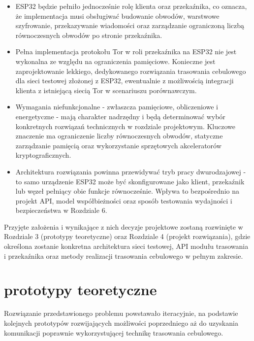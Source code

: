\documentclass[thesis=inz,faculty=ee]{EE-dyplom}
\begin{document}
    \begin{itemize}
    
    \item ESP32 będzie pełniło jednocześnie rolę klienta oraz przekaźnika, co oznacza, że implementacja musi obsługiwać budowanie obwodów, warstwowe szyfrowanie, 
    przekazywanie wiadomości oraz zarządzanie ograniczoną liczbą równoczesnych obwodów po stronie przekaźnika.

    \item Pełna implementacja protokołu Tor w roli przekaźnika na ESP32 nie jest wykonalna ze względu na ograniczenia pamięciowe. Konieczne jest zaprojektowanie 
    lekkiego, dedykowanego rozwiązania trasowania cebulowego dla sieci testowej złożonej z ESP32, ewentualnie z możliwością integracji klienta z istniejącą siecią Tor w 
    scenariuszu porównawczym.

    \item Wymagania niefunkcjonalne - zwłaszcza pamięciowe, obliczeniowe i energetyczne - mają charakter nadrzędny i będą determinować wybór konkretnych rozwiązań 
    technicznych w rozdziale projektowym. Kluczowe znaczenie ma ograniczenie liczby równoczesnych obwodów, statyczne zarządzanie pamięcią oraz wykorzystanie sprzętowych 
    akceleratorów kryptograficznych.

    \item Architektura rozwiązania powinna przewidywać tryb pracy dwurodzajowej - to samo urządzenie ESP32 może być skonfigurowane jako klient, przekaźnik lub węzeł 
    pełniący obie funkcje równocześnie. Wpływa to bezpośrednio na projekt API, model współbieżności oraz sposób testowania wydajności i bezpieczeństwa w Rozdziale 6.
    
    \end{itemize}

    Przyjęte założenia i wynikające z nich decyzje projektowe zostaną rozwinięte w Rozdziale 3 (prototypy teoretyczne) oraz Rozdziale 4 (projekt rozwiązania), gdzie określona 
    zostanie konkretna architektura sieci testowej, API modułu trasowania i przekaźnika oraz metody realizacji trasowania cebulowego w pełnym zakresie.

    \chapter{prototypy teoretyczne}
    
    Rozwiązanie przedstawionego problemu powstawało iteracyjnie, na podstawie kolejnych prototypów rozwijających możliwości poprzedniego aż do uzyskania komunikacji
    poprawnie wykorzystującej technikę trasowania cebulowego. 
\end{document}
